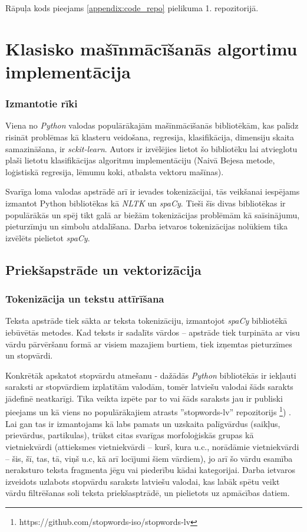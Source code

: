 Rāpuļa kods pieejams \ref{appendix:code_repo} pielikuma 1. repozitorijā.

\section{Klasisko mašīnmācīšanās algortimu implementācija}

\subsubsection{Izmantotie rīki}
Viena no \textit{Python} valodas populārākajām mašīnmācīšanās bibliotēkām, kas palīdz risināt problēmas kā klasteru veidošana, regresija, klasifikācija, dimensiju skaita samazināšana, ir \textit{sckit-learn}. Autors ir izvēlējies lietot šo bibliotēku lai atvieglotu plaši lietotu klasifikācijas algoritmu implementāciju (Naivā Bejesa metode, loģistiskā regresija, lēmumu koki,  atbalsta vektoru mašīnas). 

Svarīga loma valodas apstrādē arī ir ievades tokenizācijai, tās veikšanai iespējams izmantot Python bibliotēkas kā \textit{NLTK} un \textit{spaCy}. Tieši šīs divas bibliotēkas ir populārākās un spēj tikt galā ar biežām tokenizācijas problēmām kā saīsinājumu, pieturzīmju un simbolu atdalīšana. Darba ietvaros tokenizācijas nolūkiem tika izvēlēts pielietot \textit{spaCy}.

\subsection{Priekšapstrāde un vektorizācija}
\subsubsection{Tokenizācija un tekstu attīrīšana}
Teksta apstrāde tiek sākta ar teksta tokenizāciju, izmantojot \textit{spaCy} bibliotēkā iebūvētās metodes. Kad teksts ir sadalīts vārdos – apstrāde tiek turpināta ar visu vārdu pārvēršanu formā ar visiem mazajiem burtiem, tiek izņemtas pieturzīmes un stopvārdi.

Konkrētāk apskatot stopvārdu atmešanu - dažādās \textit{Python} bibliotēkās ir iekļauti saraksti ar stopvārdiem izplatītām valodām, tomēr latviešu valodai šāds sarakts jādefinē neatkarīgi. Tika veikta izpēte par to vai šāds saraksts jau ir publiski pieejams un kā viens no populārākajiem atrasts ''stopwords-lv'' repozitorijs \footnote{https://github.com/stopwords-iso/stopwords-lv}) . Lai gan tas ir izmantojams kā labs pamats un uzskaita palīgvārdus (saikļus, prievārdus, partikulas), trūkst citas svarīgas morfoloģiskās grupas kā vietniekvārdi (attieksmes vietniekvārdi – kurš, kura u.c., norādāmie vietniekvārdi – šis, šī, tas, tā, viņš u.c, kā arī locījumi šiem vārdiem), jo arī šo vārdu esamība neraksturo teksta fragmenta jēgu vai piederību kādai kategorijai. Darba ietvaros izveidots uzlabots stopvārdu saraksts latviešu valodai, kas labāk spētu veikt vārdu filtrēšanas soli teksta priekšasptrādē, un pielietots uz apmācības datiem. 

